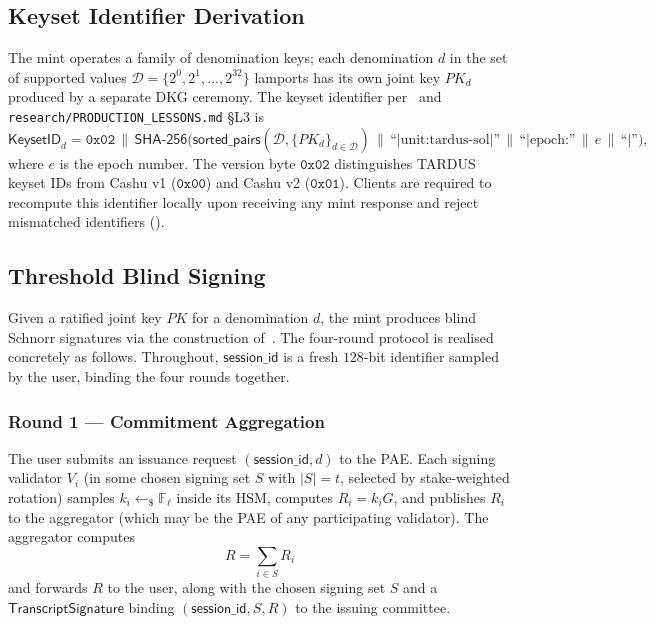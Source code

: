 \subsection{Keyset Identifier Derivation}
\label{sec:mint-keysetid}

The mint operates a family of denomination keys; each denomination $d$ in the set of supported values $\mathcal{D} = \{2^0, 2^1, \ldots, 2^{32}\}$ lamports has its own joint key $PK_d$ produced by a separate DKG ceremony. The keyset identifier per~ and \texttt{research/PRODUCTION\_LESSONS.md} §L3 is
\[
  \mathsf{KeysetID}_d = \mathtt{0x02} \,\|\, \mathsf{SHA\text{-}256}\bigl( \mathsf{sorted\_pairs}(\mathcal{D}, \{PK_d\}_{d \in \mathcal{D}}) \,\|\, \text{``|unit:tardus-sol|''} \,\|\, \text{``|epoch:''} \,\|\, e \,\|\, \text{``|''} \bigr),
\]
where $e$ is the epoch number. The version byte $\mathtt{0x02}$ distinguishes TARDUS keyset IDs from Cashu v1 ($\mathtt{0x00}$) and Cashu v2 ($\mathtt{0x01}$). Clients are required to recompute this identifier locally upon receiving any mint response and reject mismatched identifiers ().

\subsection{Threshold Blind Signing}
\label{sec:mint-blindsig}

Given a ratified joint key $PK$ for a denomination $d$, the mint produces blind Schnorr signatures via the construction of~. The four-round protocol is realised concretely as follows. Throughout, $\mathsf{session\_id}$ is a fresh $128$-bit identifier sampled by the user, binding the four rounds together.

\subsubsection{Round 1 --- Commitment Aggregation}
\label{sec:mint-sign-r1}

The user submits an issuance request $(\mathsf{session\_id}, d)$ to the PAE. Each signing validator $V_i$ (in some chosen signing set $S$ with $|S| = t$, selected by stake-weighted rotation) samples $k_i \leftarrow_\$ \mathbb{F}_\ell$ inside its HSM, computes $R_i = k_i G$, and publishes $R_i$ to the aggregator (which may be the PAE of any participating validator). The aggregator computes
\[
  R = \sum_{i \in S} R_i
\]
and forwards $R$ to the user, along with the chosen signing set $S$ and a $\mathsf{TranscriptSignature}$ binding $(\mathsf{session\_id}, S, R)$ to the issuing committee.

